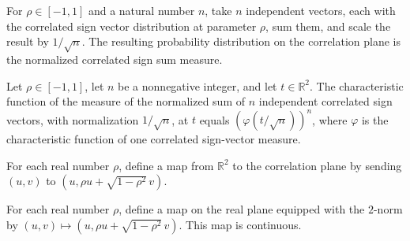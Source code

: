 \begin{definition}
\label{FABL.normalizedCorrelatedSignSumMeasure}
\leanok
{}
For $\rho\in[-1,1]$ and a natural number $n$, take $n$ independent vectors, each with
the correlated sign vector distribution at parameter $\rho$, sum them, and scale the
result by $1/\sqrt n$. The resulting probability distribution on the correlation plane
is the normalized correlated sign sum measure.
\end{definition}

\begin{theorem}
\label{FABL.charFun_normalizedCorrelatedSignSumMeasure}
\leanok
{}
Let $\rho\in[-1,1]$, let $n$ be a nonnegative integer, and let $t\in\mathbb R^2$. The
characteristic function of the measure of the normalized sum of $n$ independent
correlated sign vectors, with normalization $1/\sqrt n$, at $t$ equals $\displaystyle
\left(\varphi\left(t/\sqrt n\right)\right)^n$, where $\varphi$ is the characteristic
function of one correlated sign-vector measure.
\end{theorem}

\begin{definition}
\label{FABL.gaussianCorrelationMap}
\leanok
{}
For each real number $\rho$, define a map from $\mathbb R^2$ to the correlation plane by
sending $(u,v)$ to $(u,\rho u+\sqrt{1-\rho^2}\,v)$.
\end{definition}

\begin{theorem}
\label{FABL.continuous_gaussianCorrelationMap}
\leanok
{}
For each real number $\rho$, define a map on the real plane equipped with the $2$-norm
by $(u,v)\mapsto (u,\rho u+\sqrt{1-\rho^2}\,v)$. This map is continuous.
\end{theorem}

